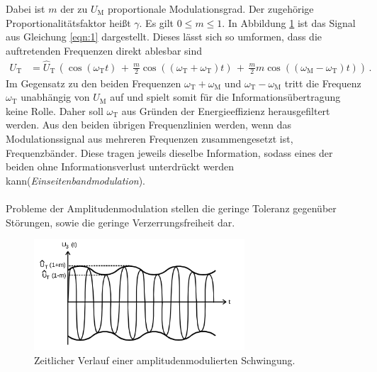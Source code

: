 Dabei ist $m$ der zu $U_{\text{M}}$ proportionale Modulationsgrad.
Der zugehörige Proportionalitätsfaktor heißt $\gamma$.
Es gilt $0 \leq m \leq 1$.
In Abbildung \ref{fig:amplitudenmodulation_1} ist das Signal aus Gleichung
\eqref{eqn:1} dargestellt.
Dieses lässt sich so umformen, dass die auftretenden Frequenzen direkt
ablesbar sind
\begin{align}
\label{eqn:2}
U_{\text{T}} &= \hat{U}_{\text{T}} \, \left( \cos(\omega_{\text{T}} t) \, + \, \frac{m}{2} \cos\left(\left( \omega_{\text{T}} + \omega_{\text{T}} \right)t\right) \, + \, \frac{m}{2} m \cos  \left( \left( \omega_{\text{M}} - \omega_{\text{T}} \right)t\right)\right) \, .
\end{align}
Im Gegensatz zu den beiden Frequenzen $\omega_{\text{T}} + \omega_{\text{M}}$ und $\omega_{\text{T}} - \omega_{\text{M}}$ tritt die Frequenz $\omega_{\text{T}}$
unabhängig von $U_{\text{M}}$ auf und spielt somit
für die Informationsübertragung keine Rolle. Daher soll $\omega_{\text{T}}$
aus Gründen der Energieeffizienz herausgefiltert werden.
Aus den beiden übrigen Frequenzlinien werden, wenn das Modulationssignal
aus mehreren Frequenzen zusammengesetzt ist, Frequenzbänder.
Diese tragen jeweils dieselbe Information, sodass eines der beiden ohne
Informationsverlust unterdrückt werden kann(\textit{Einseitenbandmodulation}).\\ \\

Probleme der Amplitudenmodulation stellen die geringe Toleranz gegenüber
Störungen, sowie die geringe Verzerrungsfreiheit dar.

\begin{figure}
\centering
\includegraphics[width=0.7\textwidth]{figures/amplitudenmodulation.PNG}
\caption{Zeitlicher Verlauf einer amplitudenmodulierten Schwingung.\cite{sample}}
\label{fig:amplitudenmodulation_1}
\end{figure}

